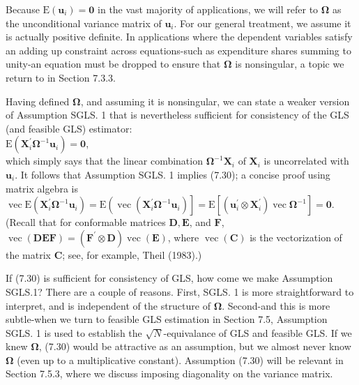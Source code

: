 \documentclass[10pt]{article}
\begin{document}
Because $\mathrm{E}\left(\mathbf{u}_{i}\right)=\mathbf{0}$ in the vast majority of applications, we will refer to $\boldsymbol{\Omega}$ as the unconditional variance matrix of $\mathbf{u}_{i}$. For our general treatment, we assume it is actually positive definite. In applications where the dependent variables satisfy an adding up constraint across equations-such as expenditure shares summing to unity-an equation must be dropped to ensure that $\boldsymbol{\Omega}$ is nonsingular, a topic we return to in Section 7.3.3.

Having defined $\boldsymbol{\Omega}$, and assuming it is nonsingular, we can state a weaker version of Assumption SGLS. 1 that is nevertheless sufficient for consistency of the GLS (and feasible GLS) estimator:\\
$\mathrm{E}\left(\mathbf{X}_{i}^{\prime} \boldsymbol{\Omega}^{-1} \mathbf{u}_{i}\right)=\mathbf{0}$,\\
which simply says that the linear combination $\boldsymbol{\Omega}^{-1} \mathbf{X}_{i}$ of $\mathbf{X}_{i}$ is uncorrelated with $\mathbf{u}_{i}$. It follows that Assumption SGLS. 1 implies (7.30); a concise proof using matrix algebra is\\
$\operatorname{vec} \mathrm{E}\left(\mathbf{X}_{i}^{\prime} \boldsymbol{\Omega}^{-1} \mathbf{u}_{i}\right)=\mathrm{E}\left(\operatorname{vec}\left(\mathbf{X}_{i}^{\prime} \boldsymbol{\Omega}^{-1} \mathbf{u}_{i}\right)\right]=\mathrm{E}\left[\left(\mathbf{u}_{i}^{\prime} \otimes \mathbf{X}_{i}^{\prime}\right) \operatorname{vec} \boldsymbol{\Omega}^{-1}\right]=\mathbf{0}$.\\
(Recall that for conformable matrices $\mathbf{D}, \mathbf{E}$, and $\mathbf{F}$, $\operatorname{vec}(\mathbf{D E F})=\left(\mathbf{F}^{\prime} \otimes \mathbf{D}\right) \operatorname{vec}(\mathbf{E})$, where $\operatorname{vec}(\mathbf{C})$ is the vectorization of the matrix $\mathbf{C}$; see, for example, Theil (1983).)

If (7.30) is sufficient for consistency of GLS, how come we make Assumption SGLS.1? There are a couple of reasons. First, SGLS. 1 is more straightforward to interpret, and is independent of the structure of $\boldsymbol{\Omega}$. Second-and this is more subtle-when we turn to feasible GLS estimation in Section 7.5, Assumption SGLS. 1 is used to establish the $\sqrt{N}$-equivalance of GLS and feasible GLS. If we knew $\boldsymbol{\Omega}$, (7.30) would be attractive as an assumption, but we almost never know $\boldsymbol{\Omega}$ (even up to a multiplicative constant). Assumption (7.30) will be relevant in Section 7.5.3, where we discuss imposing diagonality on the variance matrix.
\end{document}
